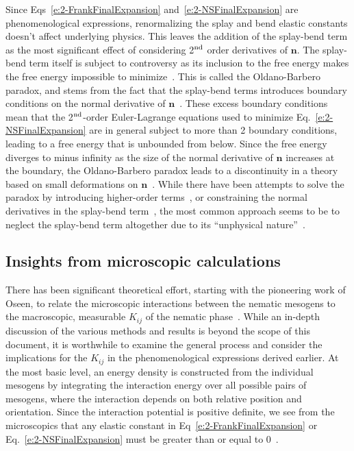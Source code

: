 Since Eqs~\ref{e:2-FrankFinalExpansion} and~\ref{e:2-NSFinalExpansion} are phenomenological expressions, renormalizing the splay and bend elastic constants doesn't affect underlying physics.
This leaves the addition of the splay-bend term as the most significant effect of considering 2$^\textup{\rm nd}$ order derivatives of $\mathbf{n}$.
The splay-bend term itself is subject to controversy as its inclusion to the free energy makes the free energy impossible to minimize~\cite{RN214,RN215,RN216}.
This is called the Oldano-Barbero paradox, and stems from the fact that the splay-bend terms introduces boundary conditions on the normal derivative of $\mathbf{n}$~\cite{RN216,RN220,RN219,RN221}.
These excess boundary conditions mean that the 2$^\textup{\rm nd}$-order Euler-Lagrange equations used to minimize Eq.~\ref{e:2-NSFinalExpansion} are in general subject to more than 2 boundary conditions, leading to a free energy that is unbounded from below.
Since the free energy diverges to minus infinity as the size of the normal derivative of $\mathbf{n}$ increases at the boundary, the Oldano-Barbero paradox leads to a discontinuity in a theory based on small deformations on $\mathbf{n}$~\cite{RN219}.
While there have been attempts to solve the paradox by introducing higher-order terms~\cite{RN220}, or constraining the normal derivatives in the splay-bend term~\cite{RN221}, the most common approach seems to be to neglect the splay-bend term altogether due to its ``unphysical nature''~\cite{RN55,RN222}.

\subsection{Insights from microscopic calculations}
There has been significant theoretical effort, starting with the pioneering work of Oseen, to relate the microscopic interactions between the nematic mesogens to the macroscopic, measurable $K_{ij}$ of the nematic phase~\cite{RN56,RN55,RN205,RN217,RN225,RN224,RN218,RN222}.
While an in-depth discussion of the various methods and results is beyond the scope of this document, it is worthwhile to examine the general process and consider the implications for the $K_{ij}$ in the phenomenological expressions derived earlier.
At the most basic level, an energy density is constructed from the individual mesogens by integrating the interaction energy over all possible pairs of mesogens, where the interaction depends on both relative position and orientation.
Since the interaction potential is positive definite, we see from the microscopics that any elastic constant in Eq~\ref{e:2-FrankFinalExpansion} or Eq.~\ref{e:2-NSFinalExpansion} must be greater than or equal to 0~\cite{RN205}.

